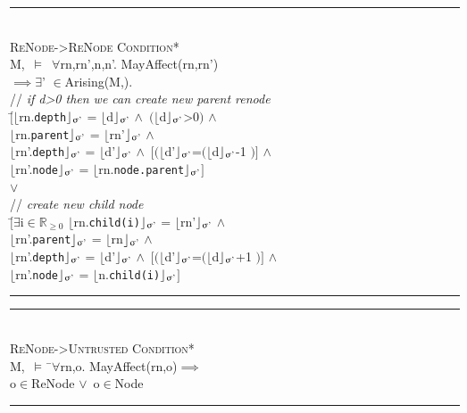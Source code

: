 \documentclass[a4paper,11pt, twoside,twocolumn]{article}
\newenvironment{logic}
{\begin{minipage}[c]{\linewidth}  \small \vspace{0.5em}\begin{tabbing}}
{\end{tabbing}\end{minipage}\vspace{0.5em}}
\newcommand{\loin}{$\in$}
\newcommand{\loforall}{$\forall$}
\newcommand{\loexists}{$\exists$}
\newcommand{\loand}{$\land$}
\newcommand{\loor} {$\lor$}
\newcommand{\loimplies}{$\implies$}
\newcommand{\losigma}{\text{$\upsigma$}}
\newcommand{\loturns} {$\vDash$}
\newcommand{\loexec}[2] {$\lfloor$#1$\rfloor _{\text{#2}}$}
\newcommand{\hr}{\rule{\linewidth}{0.4pt}}
\begin{document}
\begin{logic} 
\hr\\
\textsc{\normalsize *ReNode->ReNode Condition*}\\
M,\losigma\ \loturns\ \loforall rn,rn',n,n'. MayAffect(rn,rn')\\
\loimplies \loexists \losigma' \loin Arising(M,\losigma).\\
// \textit{if d>0 then we can create new parent renode} \\
$[$\=\loexec{rn.\texttt{depth}}{\losigma'} = \loexec{d}{\losigma'} \loand\ $($\loexec{d}{\losigma'}>0$)$ \loand\\
\>\loexec{rn.\texttt{parent}}{\losigma'} = \loexec{rn'}{\losigma'} \loand\\
\>\loexec{rn'.\texttt{depth}}{\losigma'} = \loexec{d'}{\losigma'} \loand\ $[($\loexec{d'}{\losigma'}=$($\loexec{d}{\losigma'}-1 $)]$ \loand\\
\>\loexec{rn'.\texttt{node}}{\losigma'} = \loexec{rn.\texttt{node.parent}}{\losigma'}$]$\\
\loor\\
// \textit{create new child node} \\
$[$\=\loexists i\loin$\mathbb{R}_{\geq 0}$ \loexec{rn.\texttt{child(i)}}{\losigma'} = \loexec{rn'}{\losigma'} \loand\\ 
\>\loexec{rn'.\texttt{parent}}{\losigma'} = \loexec{rn}{\losigma'} \loand\\
\>\loexec{rn'.\texttt{depth}}{\losigma'} = \loexec{d'}{\losigma'}  \loand\ $[($\loexec{d'}{\losigma'}=$($\loexec{d}{\losigma'}+1 $)]$ \loand\\\>\loexec{rn'.\texttt{node}}{\losigma'} = \loexec{n.\texttt{child(i)}}{\losigma'}$]$\\
\hr
\end{logic}
\begin{logic} 
\hr\\
\textsc{\normalsize *ReNode->Untrusted Condition*}\\
M,\losigma\ \loturns\ \=\loforall rn,o. MayAffect(rn,o)\loimplies \\
\> o\loin ReNode \loor\ o\loin Node\\
\hr
\end{logic}
\end{document}
